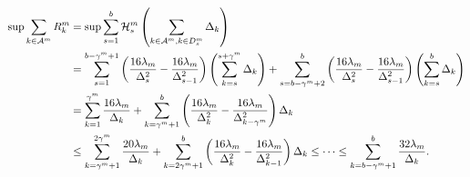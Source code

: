 \begin{equation}\label{eq:sog-mab-scale}
\begin{split}
    \sup \sum_{k \in {\mathcal{A}}^m} R_k^m &= \sup \sum_{s=1}^{b} {\mathcal{H}}_s^m \left(\sum_{k \in {\mathcal{A}}^m, k \in D_s^m}\Delta_k \right)\\
    &= \sum_{s = 1}^{b - \gamma^m + 1} \left(\frac{16\lambda_m}{\Delta_s^2} - \frac{16\lambda_m}{\Delta_{s-1}^2}\right) \left(\sum_{k = s}^{s + \gamma^m} \Delta_k\right) 
    + \sum_{s = b - \gamma^m + 2}^{b} \left(\frac{16\lambda_m}{\Delta_s^2} - \frac{16\lambda_m}{\Delta_{s-1}^2}\right) \left(\sum_{k=s}^{b} \Delta_k\right)\\
    &=\sum_{k=1}^{\gamma^m} \frac{16\lambda_m}{\Delta_k} + \sum_{k=\gamma^m+1}^{b}\left(\frac{16\lambda_m}{\Delta_k^2} - \frac{16\lambda_m}{\Delta_{k-\gamma^m}^2}\right)\Delta_k\\
    &\leq \sum_{k=\gamma^m + 1}^{2\gamma^m} \frac{20\lambda_m}{\Delta_k} + \sum_{k=2\gamma^m+1}^{b}\left(\frac{16\lambda_m}{\Delta_k^2} - \frac{16\lambda_m}{\Delta_{k-1}^2}\right)\Delta_k 
    \leq \cdots \leq \sum_{k=b-\gamma^m +1}^{b} \frac{32\lambda_m}{\Delta_k}.
\end{split}
\end{equation}

